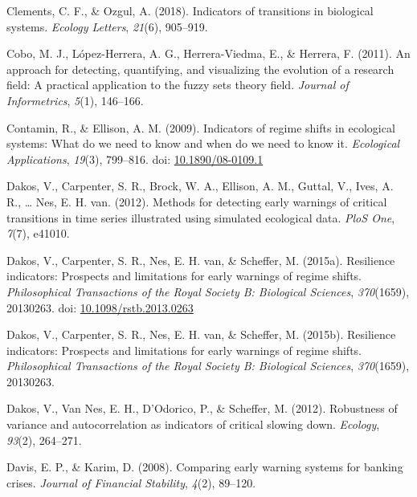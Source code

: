 \documentclass[12pt,twoside,openany]{reedthesis}
\begin{document}
\leavevmode\hypertarget{ref-clements2018indicators}{}%
Clements, C. F., \& Ozgul, A. (2018). Indicators of transitions in biological systems. \emph{Ecology Letters}, \emph{21}(6), 905--919.

\leavevmode\hypertarget{ref-cobo2011approach}{}%
Cobo, M. J., López-Herrera, A. G., Herrera-Viedma, E., \& Herrera, F. (2011). An approach for detecting, quantifying, and visualizing the evolution of a research field: A practical application to the fuzzy sets theory field. \emph{Journal of Informetrics}, \emph{5}(1), 146--166.

\leavevmode\hypertarget{ref-contamin_indicators_2009}{}%
Contamin, R., \& Ellison, A. M. (2009). Indicators of regime shifts in ecological systems: What do we need to know and when do we need to know it. \emph{Ecological Applications}, \emph{19}(3), 799--816. doi: \href{https://doi.org/10.1890/08-0109.1}{10.1890/08-0109.1}

\leavevmode\hypertarget{ref-dakos_methods_2012}{}%
Dakos, V., Carpenter, S. R., Brock, W. A., Ellison, A. M., Guttal, V., Ives, A. R., \ldots{} Nes, E. H. van. (2012). Methods for detecting early warnings of critical transitions in time series illustrated using simulated ecological data. \emph{PloS One}, \emph{7}(7), e41010.

\leavevmode\hypertarget{ref-dakos_resilience_2015}{}%
Dakos, V., Carpenter, S. R., Nes, E. H. van, \& Scheffer, M. (2015a). Resilience indicators: Prospects and limitations for early warnings of regime shifts. \emph{Philosophical Transactions of the Royal Society B: Biological Sciences}, \emph{370}(1659), 20130263. doi: \href{https://doi.org/10.1098/rstb.2013.0263}{10.1098/rstb.2013.0263}

\leavevmode\hypertarget{ref-dakos2015resilience}{}%
Dakos, V., Carpenter, S. R., Nes, E. H. van, \& Scheffer, M. (2015b). Resilience indicators: Prospects and limitations for early warnings of regime shifts. \emph{Philosophical Transactions of the Royal Society B: Biological Sciences}, \emph{370}(1659), 20130263.

\leavevmode\hypertarget{ref-dakos2012robustness}{}%
Dakos, V., Van Nes, E. H., D'Odorico, P., \& Scheffer, M. (2012). Robustness of variance and autocorrelation as indicators of critical slowing down. \emph{Ecology}, \emph{93}(2), 264--271.

\leavevmode\hypertarget{ref-davis_comparing_2008}{}%
Davis, E. P., \& Karim, D. (2008). Comparing early warning systems for banking crises. \emph{Journal of Financial Stability}, \emph{4}(2), 89--120.
\end{document}
